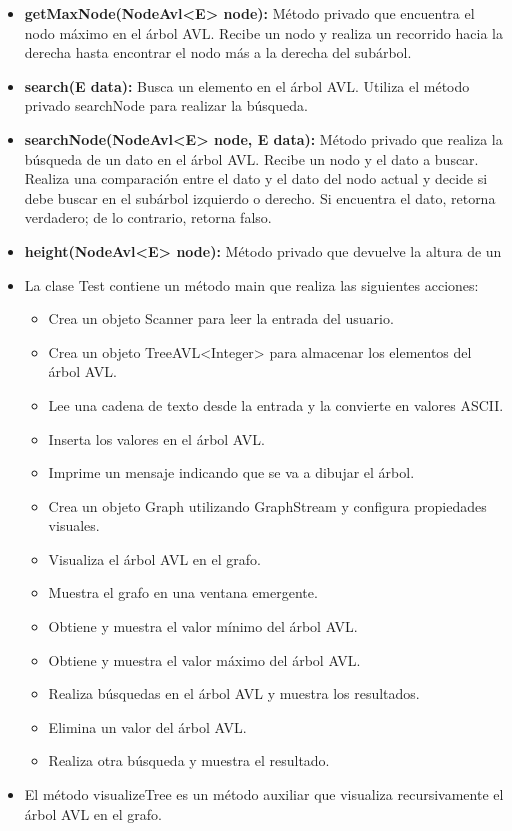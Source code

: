 \documentclass{article}
\begin{document}
\begin{itemize}
\begin{itemize}
			\item \textbf{getMaxNode(NodeAvl<E> node):} Método privado que encuentra el nodo máximo en el árbol AVL. Recibe un nodo y realiza un recorrido hacia la derecha hasta encontrar el nodo más a la derecha del subárbol.
			\item \textbf{search(E data):} Busca un elemento en el árbol AVL. Utiliza el método privado searchNode para realizar la búsqueda.
			\item \textbf{searchNode(NodeAvl<E> node, E data):} Método privado que realiza la búsqueda de un dato en el árbol AVL. Recibe un nodo y el dato a buscar. Realiza una comparación entre el dato y el dato del nodo actual y decide si debe buscar en el subárbol izquierdo o derecho. Si encuentra el dato, retorna verdadero; de lo contrario, retorna falso.
			\item \textbf{height(NodeAvl<E> node):} Método privado que devuelve la altura de un
		\end{itemize}		
	\end{itemize}	
		
	
	
	\begin{itemize}
		\item La clase Test contiene un método main que realiza las siguientes acciones:
		\begin{itemize}
			\item Crea un objeto Scanner para leer la entrada del usuario.
			\item Crea un objeto TreeAVL<Integer> para almacenar los elementos del árbol AVL.
			\item Lee una cadena de texto desde la entrada y la convierte en valores ASCII.
			\item Inserta los valores en el árbol AVL.
			\item Imprime un mensaje indicando que se va a dibujar el árbol.
			\item Crea un objeto Graph utilizando GraphStream y configura propiedades visuales.
			\item Visualiza el árbol AVL en el grafo.
			\item Muestra el grafo en una ventana emergente.
			\item Obtiene y muestra el valor mínimo del árbol AVL.
			\item Obtiene y muestra el valor máximo del árbol AVL.
			\item Realiza búsquedas en el árbol AVL y muestra los resultados.
			\item Elimina un valor del árbol AVL.
			\item Realiza otra búsqueda y muestra el resultado.
		\end{itemize}
		\item El método visualizeTree es un método auxiliar que visualiza recursivamente el árbol AVL en el grafo.
	\end{itemize}
	
\end{document}
